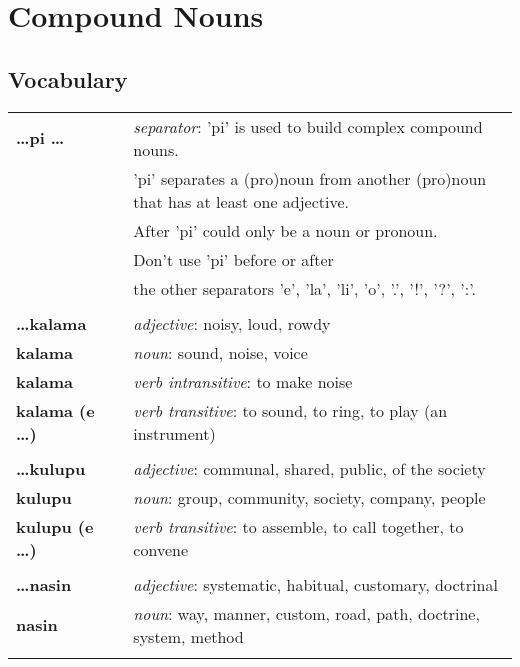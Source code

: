 \section{Compound Nouns}
%
\subsection*{Vocabulary}
%
\begin{supertabular}{p{2,5cm}|ll}
\textbf{\dots pi \dots } && \textit{separator}: 'pi' is used to build complex compound nouns. \\ && 'pi' separates a (pro)noun from another (pro)noun that has at least one adjective. \\ && After 'pi' could only be a noun or pronoun. \\ && Don't use 'pi' before or after \\ && the other separators 'e', 'la', 'li', 'o', '.', '!', '?', ':'.  \\ %
 && \\ %
\textbf{\dots kalama} && \textit{adjective}: noisy, loud, rowdy \\ %
\textbf{kalama} && \textit{noun}: sound, noise, voice \\ 
\textbf{kalama} && \textit{verb intransitive}: to make noise \\ %
\textbf{kalama (e \dots)} && \textit{verb transitive}: to sound, to ring, to play (an instrument) \\ %
 && \\ %
\textbf{\dots kulupu} && \textit{adjective}: communal, shared, public, of the society \\ %
\textbf{kulupu} && \textit{noun}: group, community, society, company, people \\ %
\textbf{kulupu (e \dots)} && \textit{verb transitive}: to assemble, to call together, to convene \\ %
 && \\ %
\textbf{\dots nasin} && \textit{adjective}: systematic, habitual, customary, doctrinal \\ %
\textbf{nasin} && \textit{noun}: way, manner, custom, road, path, doctrine, system, method \\ %
 && \\ %
\end{supertabular} \\
%
